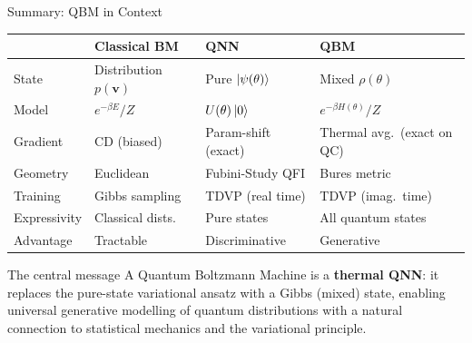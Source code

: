 \documentclass[aspectratio=169,10pt]{beamer}
\begin{document}
\begin{frame}{Summary: QBM in Context}
  \begin{center}
  \renewcommand{\arraystretch}{1.15}
  \begin{tabular}{p{2.8cm}p{3.2cm}p{3.2cm}p{3.2cm}}
    \toprule
    & \textbf{Classical BM} & \textbf{QNN} & \textbf{QBM} \\
    \midrule
    State & Distribution $p(\mathbf{v})$ & Pure $\ket{\psi(\theta)}$
          & Mixed $\rho(\theta)$ \\
    Model & $e^{-\beta E}/Z$ & $U(\theta)\ket{0}$
          & $e^{-\beta H(\theta)}/Z$ \\
    Gradient & CD (biased) & Param-shift (exact)
             & Thermal avg.\ (exact on QC) \\
    Geometry & Euclidean & Fubini-Study QFI
             & Bures metric \\
    Training & Gibbs sampling & TDVP (real time)
             & TDVP (imag.\ time) \\
    Expressivity & Classical dists. & Pure states
                 & All quantum states \\
    Advantage & Tractable & Discriminative & Generative \\
    \bottomrule
  \end{tabular}
  \end{center}

  \vspace{0.1cm}
  \begin{alertblock}{The central message}
    A Quantum Boltzmann Machine is a \textbf{thermal QNN}:
    it replaces the pure-state variational ansatz with a
    Gibbs (mixed) state, enabling universal generative
    modelling of quantum distributions with a natural
    connection to statistical mechanics and the
    variational principle.
  \end{alertblock}
\end{frame}
\end{document}
